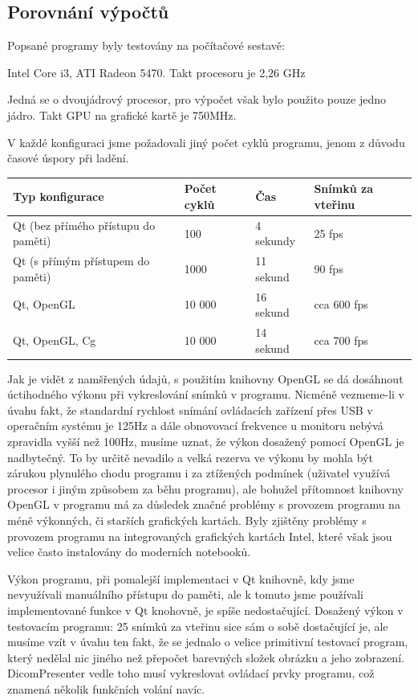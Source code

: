\subsection{Porovnání výpočtů}

Popsané programy byly testovány na počítačové sestavě:

Intel Core i3, ATI Radeon 5470. Takt procesoru je 2,26 GHz

Jedná se o dvoujádrový procesor, pro výpočet však bylo použito pouze jedno jádro. Takt GPU na grafické kartě je 750MHz.

V každé konfiguraci jsme požadovali jiný počet cyklů programu, jenom z důvodu časové úspory při ladění.

\begin{tabular}{| p{5cm} | l | l | l | }
  \hline                       
  Typ konfigurace & Počet cyklů & Čas & Snímků za vteřinu \\
  \hline
  \hline
  Qt (bez přímého přístupu do paměti)& 100 & 4 sekundy & 25 fps\\
  \hline
  Qt (s přímým přístupem do paměti)& 1000 & 11 sekund & 90 fps\\
  \hline
  Qt, OpenGL & 10 000 & 16 sekund & cca 600  fps \\
  \hline
  Qt, OpenGL, Cg & 10 000 & 14 sekund & cca 700 fps \\
  \hline  
\end{tabular}

Jak je vidět z namšřených údajů, s použitím knihovny OpenGL se dá dosáhnout úctihodného výkonu při vykreslování snímků v programu. Nicméně vezmeme-li v úvahu fakt, že standardní rychlost snímání ovládacích zařízení přes USB v operačním systému je 125Hz a dále obnovovací frekvence u monitoru nebývá zpravidla vyšší než 100Hz, musíme uznat, že výkon dosažený pomocí OpenGL je nadbytečný. To by určitě nevadilo a velká rezerva ve výkonu by mohla být zárukou plynulého chodu programu i za ztížených podmínek (uživatel využívá procesor i jiným způsobem za běhu programu), ale bohužel přítomnost knihovny OpenGL v programu má za důsledek značné problémy s provozem programu na méně výkonných, či starších grafických kartách. Byly zjištěny problémy s provozem programu na integrovaných grafických kartách Intel, které však jsou velice často instalovány do moderních notebooků.

Výkon programu, při pomalejší implementaci v Qt knihovně, kdy jsme nevyužívali manuálního přístupu do paměti, ale k tomuto jsme používali implementované funkce v Qt knohovně, je spíše nedostačující. Dosažený výkon v testovacím programu: 25 snímků za vteřinu sice sám o sobě dostačující je, ale musíme vzít v úvahu ten fakt, že se jednalo o velice primitivní testovací program, který nedělal nic jiného než přepočet barevných složek obrázku a jeho zobrazení. DicomPresenter vedle toho musí vykreslovat ovládací prvky programu, což znamená několik funkčních volání navíc.

